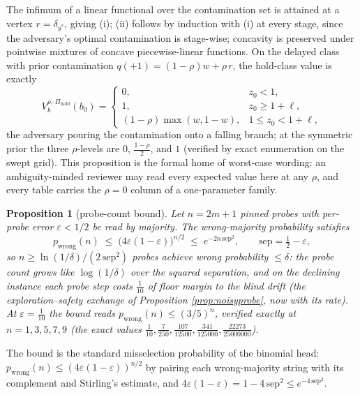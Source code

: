 \documentclass[10pt,twocolumn]{article}
\theoremstyle{plain}
\newtheorem{proposition}[theorem]{Proposition}
\theoremstyle{definition}
\theoremstyle{remark}
\begin{document}
The infimum of a linear functional over the contamination set is attained
at a vertex \(r = \delta_{y^{*}}\), giving (i); (ii) follows by
induction with (i) at every stage, since the adversary's optimal
contamination is stage-wise; concavity is preserved under pointwise
mixtures of concave piecewise-linear functions. On the delayed class
with prior contamination \(q(+1) = (1 - \rho)w + \rho\, r\), the
hold-class value is exactly
\[
V^{\rho,\, \Pi_{\mathrm{hold}}}_{k}(b_{0}) =
\begin{cases} 0, & z_{0} < 1,\\
1, & z_{0} \ge 1 + \ell,\\
(1 - \rho) \max(w, 1 - w), & 1 \le z_{0} < 1 + \ell,
\end{cases}
\]
the adversary pouring the contamination onto a falling branch; at the
symmetric prior the three \(\rho\)-levels are \(0\), \(
\tfrac{1 - \rho}{2}\), and \(1\) (verified by exact enumeration on
the swept grid). This proposition is the formal home of worst-case
wording: an ambiguity-minded reviewer may read every expected value here
at any \(\rho\), and every table carries the \(\rho = 0\) column of
a one-parameter family.

\begin{proposition}[probe-count bound]\label{prop:probecount}
Let \(n = 2m + 1\) pinned probes with per-probe error
\(\varepsilon < 1/2\) be read by majority. The wrong-majority
probability satisfies
\[
p_{\mathrm{wrong}}(n) \;\le\; \bigl(4\varepsilon(1 - \varepsilon)\bigr)^{n/2}
\;\le\; e^{-2 n\, \mathrm{sep}^{2}},
\qquad \mathrm{sep} = \tfrac12 - \varepsilon,
\]
so \(n \ge \ln(1/\delta) / (2\,\mathrm{sep}^{2})\) probes achieve
wrong probability \(\le \delta\): the probe count grows like
\(\log(1/\delta)\) over the squared separation, and on the declining
instance each probe step costs \(\tfrac1{10}\) of floor margin to the
blind drift (the exploration--safety exchange of Proposition
\ref{prop:noisyprobe}, now with its rate). At
\(\varepsilon = \tfrac1{10}\) the bound reads
\(p_{\mathrm{wrong}}(n) \le (3/5)^{n}\), verified exactly at
\(n = 1, 3, 5, 7, 9\) (the exact values \(\tfrac1{10},
\tfrac7{250}, \tfrac{107}{12500}, \tfrac{341}{125000},
\tfrac{22273}{25000000}\)).
\end{proposition}

The bound is the standard misselection probability of the binomial
head: \(p_{\mathrm{wrong}}(n) \le (4\varepsilon(1-\varepsilon))^{n/2}\)
by pairing each wrong-majority string with its complement and
Stirling's estimate, and \(4\varepsilon(1 - \varepsilon) =
1 - 4\,\mathrm{sep}^{2} \le e^{-4\,\mathrm{sep}^{2}}\).
\end{document}
